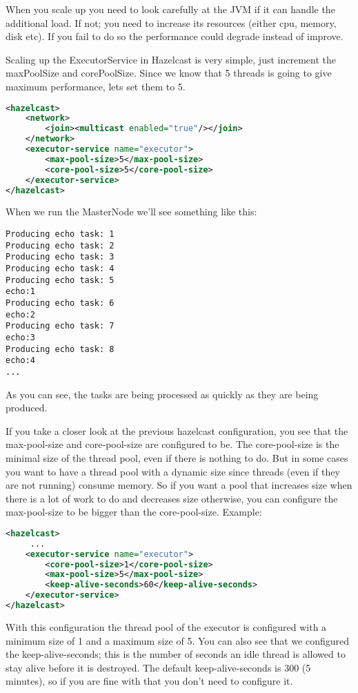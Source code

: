 When you scale up you need to look carefully at the JVM if it can handle the additional load. If not; you need to increase its resources (either cpu, memory, disk etc). If you fail to do so the performance could degrade instead of improve. 

Scaling up the ExecutorService in Hazelcast is very simple, just increment the maxPoolSize and corePoolSize. Since we know that 5 threads is going to give maximum performance, lets set them to 5.
\begin{lstlisting}[language=xml]
<hazelcast>
    <network>
        <join><multicast enabled="true"/></join>
    </network>
    <executor-service name="executor">
        <max-pool-size>5</max-pool-size>
        <core-pool-size>5</core-pool-size>
    </executor-service>
</hazelcast>
\end{lstlisting}
When we run the MasterNode we'll see something like this:
\begin{lstlisting}
Producing echo task: 1
Producing echo task: 2
Producing echo task: 3
Producing echo task: 4
Producing echo task: 5
echo:1
Producing echo task: 6
echo:2
Producing echo task: 7
echo:3
Producing echo task: 8
echo:4
...
\end{lstlisting}
As you can see, the tasks are being processed as quickly as they are being produced. 

If you take a closer look at the previous hazelcast configuration, you see that the max-pool-size and core-pool-size are configured to be. The core-pool-size is the minimal size of the thread pool, even if there is nothing to do. But in some cases you want to have a thread pool with a dynamic size since threads (even if they are not running) consume memory. So if you want a pool that increases size when there is a lot of work to do and decreases size otherwise, you can configure the max-pool-size to be bigger than the core-pool-size. Example:
\begin{lstlisting}[language=xml]
<hazelcast>
     ...  
    <executor-service name="executor">
        <core-pool-size>1</core-pool-size> 
        <max-pool-size>5</max-pool-size>
        <keep-alive-seconds>60</keep-alive-seconds>
    </executor-service>
</hazelcast>
\end{lstlisting}
With this configuration the thread pool of the executor is configured with a minimum size of 1 and a maximum size of 5. You can also see that we configured the keep-alive-seconds; this is the number of seconds an idle thread is allowed to stay alive before it is destroyed. The default keep-alive-seconds is 300 (5 minutes), so if you are fine with that you don't need to configure it.

